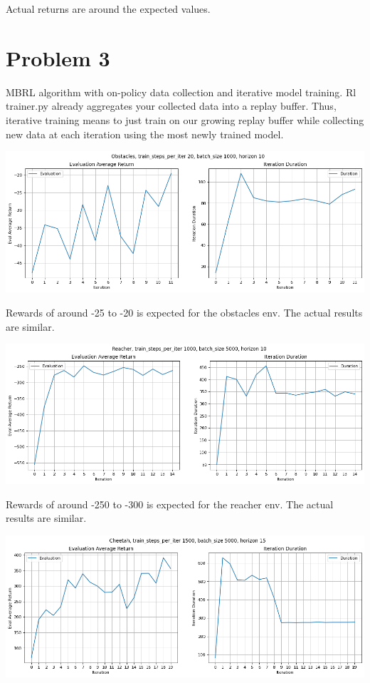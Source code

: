 \documentclass[11pt]{article}
\begin{document}
    Actual returns are around the expected values.

    \section*{Problem 3}

    MBRL algorithm with on-policy data collection and iterative model training.
    Rl trainer.py already aggregates your collected data into a replay buffer.
    Thus, iterative training means to just train on our growing replay buffer while collecting new data at each iteration using the most newly trained model.

    \hspace*{-0.6in}
    \includegraphics[scale=0.5]{q3/obstacles}

    Rewards of around -25 to -20 is expected for the obstacles env.
    The actual results are similar.

    \hspace*{-0.6in}
    \includegraphics[scale=0.5]{q3/reacher}

    Rewards of around -250 to -300 is expected for the reacher env.
    The actual results are similar.

    \hspace*{-0.6in}
    \includegraphics[scale=0.5]{q3/cheetah}
\end{document}
